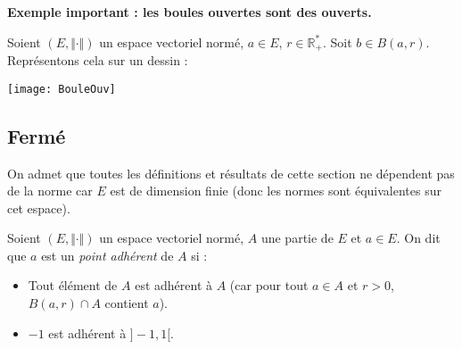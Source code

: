 \documentclass[a4paper,10pt]{report}
\begin{document}
\medskip

\textbf{Exemple important : les boules ouvertes sont des ouverts.}

Soient $(E, \Vert \cdot \Vert)$ un espace vectoriel normé, $a \in E$, $r \in \mathbb{R}_+^*$. Soit $b \in B(a,r)$. Représentons cela sur un dessin :

\begin{center}
\texttt{[image: BouleOuv]}
\end{center}

\vspace{4cm}

%

\subsection{Fermé}

\begin{Theoreme}{} On admet que toutes les définitions et résultats de cette section ne dépendent pas de la norme car $E$ est de dimension finie (donc les normes sont équivalentes sur cet espace).
\end{Theoreme}


\begin{Definition}{} 
Soient $(E, \Vert \cdot \Vert)$ un espace vectoriel normé, $A$ une partie de $E$ et $a \in E$. On dit que $a$ est un \emph{point adhérent} de $A$ si :
\vspace{1cm}
%
\end{Definition}

\begin{Remarques}{}
\begin{itemize} 
\item Tout élément de $A$ est adhérent à $A$ (car pour tout $a \in A$ et $r>0$, $B(a,r) \cap A$ contient $a$).
\item $-1$ est adhérent à $]-1,1[$.
\end{itemize}
\end{Remarques}{}
\end{document}
